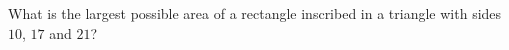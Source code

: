 What is the largest possible area of a rectangle inscribed in a triangle with sides $10$, $17$ and $21$?
